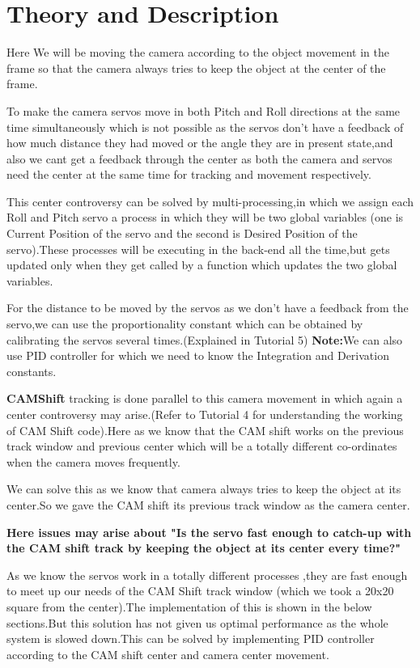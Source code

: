 \documentclass[11pt,a4paper]{article}
\begin{document}
	\section{Theory and Description}
	Here We will be moving the camera according to the object movement in the frame so that the camera always tries to keep the object at the center of the frame.
	\par To make the camera servos move in both Pitch and Roll directions at the same time simultaneously which is not possible as the servos don't have a feedback of how much distance they had moved or the angle they are in present state,and also we cant get a feedback through the center as both the camera and servos need the center at the same time for tracking and movement respectively.
	\par This center controversy can be solved by multi-processing,in which we assign each Roll and Pitch servo a process in which they will be two global variables (one is Current Position of the servo and the second is Desired Position of the servo).These processes will be executing in the back-end all the time,but gets updated only when they get called by a function which updates the two global variables.   
	\par For the distance to be moved by the servos as we don't have a feedback from the servo,we can use the proportionality constant which can be obtained by calibrating the servos several times.(Explained in Tutorial 5)
	\newline
	\textbf{Note:}We can also use PID controller for which we need to know the Integration and Derivation constants. 
	 \vspace{1cm}
	 \par\textbf{CAMShift} tracking is done parallel to this camera movement in which again a center controversy may arise.(Refer to Tutorial 4 for understanding the working   of CAM Shift code).Here as we know that the CAM shift works on the previous track window and previous center which will be a totally different co-ordinates when the camera moves frequently.
	 \par We can solve this as we know that camera always tries to keep the object at its center.So we gave the CAM shift its previous track window as the camera center.
	 \par \textbf{Here issues may arise about "Is the servo fast enough to catch-up with the CAM shift track by keeping the object at its center every time?"}
	 \par  As we know the servos work in a totally different processes ,they are fast enough to meet up our needs of the CAM Shift track window (which we took a 20x20 square from the center).The implementation of this is shown in the below sections.But this solution has not given us optimal performance as the whole system is slowed down.This can be solved by implementing PID controller according to the CAM shift center and camera center movement.
	
\end{document}
